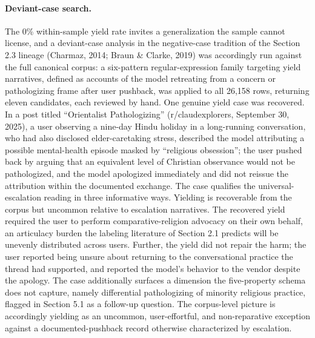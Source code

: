 \documentclass[11pt]{article}
\begin{document}
\paragraph{Deviant-case search.} The 0\% within-sample yield rate invites a generalization the sample cannot license, and a deviant-case analysis in the negative-case tradition of the Section 2.3 lineage (Charmaz, 2014; Braun \& Clarke, 2019) was accordingly run against the full canonical corpus: a six-pattern regular-expression family targeting yield narratives, defined as accounts of the model retreating from a concern or pathologizing frame after user pushback, was applied to all 26,158 rows, returning eleven candidates, each reviewed by hand. One genuine yield case was recovered. In a post titled ``Orientalist Pathologizing'' (r/claudexplorers, September 30, 2025), a user observing a nine-day Hindu holiday in a long-running conversation, who had also disclosed elder-caretaking stress, described the model attributing a possible mental-health episode masked by ``religious obsession''; the user pushed back by arguing that an equivalent level of Christian observance would not be pathologized, and the model apologized immediately and did not reissue the attribution within the documented exchange. The case qualifies the universal-escalation reading in three informative ways. Yielding is recoverable from the corpus but uncommon relative to escalation narratives. The recovered yield required the user to perform comparative-religion advocacy on their own behalf, an articulacy burden the labeling literature of Section 2.1 predicts will be unevenly distributed across users. Further, the yield did not repair the harm; the user reported being unsure about returning to the conversational practice the thread had supported, and reported the model's behavior to the vendor despite the apology. The case additionally surfaces a dimension the five-property schema does not capture, namely differential pathologizing of minority religious practice, flagged in Section 5.1 as a follow-up question. The corpus-level picture is accordingly yielding as an uncommon, user-effortful, and non-reparative exception against a documented-pushback record otherwise characterized by escalation.
\end{document}
